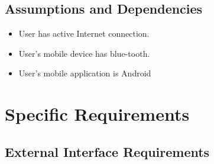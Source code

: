 \documentclass[11pt]{article}
\begin{document}
\subsection{Assumptions and Dependencies}
\begin{itemize}	
	\item User has active Internet connection. 
	\item User's mobile device has blue-tooth.
	\item User's mobile application is Android	
\end{itemize}
\section{Specific Requirements}
\subsection{External Interface Requirements}
\end{document}
